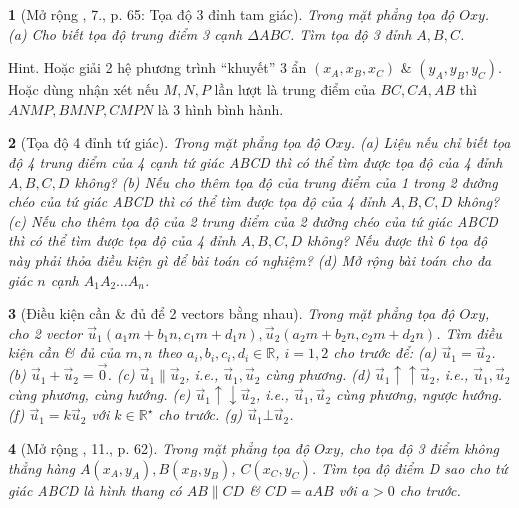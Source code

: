 \documentclass{article}
\newtheorem{baitoan}{}
\begin{document}
\begin{baitoan}[Mở rộng \cite{SGK_Toan_10_Canh_Dieu_tap_2}, 7., p. 65: Tọa độ 3 đỉnh tam giác]
	Trong mặt phẳng tọa độ $Oxy$. (a) Cho biết tọa độ trung điểm 3 cạnh $\Delta ABC$. Tìm tọa độ 3 đỉnh $A,B,C$.
\end{baitoan}
{\sf Hint.} Hoặc giải 2 hệ phương trình ``khuyết'' 3 ẩn $(x_A,x_B,x_C)$ \& $(y_A,y_B,y_C)$. Hoặc dùng nhận xét nếu $M,N,P$ lần lượt là trung điểm của $BC,CA,AB$ thì $ANMP,BMNP,CMPN$ là 3 hình bình hành.

\begin{baitoan}[Tọa độ 4 đỉnh tứ giác]
	Trong mặt phẳng tọa độ $Oxy$. (a) Liệu nếu chỉ biết tọa độ 4 trung điểm của 4 cạnh tứ giác ABCD thì có thể tìm được tọa độ của 4 đỉnh $A,B,C,D$ không? (b) Nếu cho thêm tọa độ của trung điểm của 1 trong 2 đường chéo của tứ giác ABCD thì có thể tìm được tọa độ của 4 đỉnh $A,B,C,D$ không? (c) Nếu cho thêm tọa độ của 2 trung điểm của 2 đường chéo của tứ giác ABCD thì có thể tìm được tọa độ của 4 đỉnh $A,B,C,D$ không? Nếu được thì 6 tọa độ này phải thỏa điều kiện gì để bài toán có nghiệm? (d) Mở rộng bài toán cho đa giác $n$ cạnh $A_1A_2\ldots A_n$.
\end{baitoan}

\begin{baitoan}[Điều kiện cần \& đủ để 2 vectors bằng nhau]
	Trong mặt phẳng tọa độ $Oxy$, cho 2 vector $\vec{u}_1(a_1m + b_1n,c_1m + d_1n),\vec{u}_2(a_2m + b_2n,c_2m + d_2n)$. Tìm điều kiện cần \& đủ của $m,n$ theo $a_i,b_i,c_i,d_i\in\mathbb{R}$, $i = 1,2$ cho trước để: (a) $\vec{u}_1 = \vec{u}_2$. (b) $\vec{u}_1 + \vec{u}_2 = \vec{0}$. (c) $\vec{u}_1\parallel\vec{u}_2$, i.e., $\vec{u}_1,\vec{u}_2$ cùng phương. (d) $\vec{u}_1\uparrow\uparrow\vec{u}_2$, i.e., $\vec{u}_1,\vec{u}_2$ cùng phương, cùng hướng. (e) $\vec{u}_1\uparrow\downarrow\vec{u}_2$, i.e., $\vec{u}_1,\vec{u}_2$ cùng phương, ngược hướng. (f) $\vec{u}_1 = k\vec{u}_2$ với $k\in\mathbb{R}^\star$ cho trước. (g) $\vec{u}_1\bot\vec{u}_2$.
\end{baitoan}

\begin{baitoan}[Mở rộng \cite{SBT_Toan_10_Canh_Dieu_tap_2}, 11., p. 62]
		Trong mặt phẳng tọa độ $Oxy$, cho tọa độ 3 điểm không thẳng hàng $A(x_A,y_A),B(x_B,y_B)$, $C(x_C,y_C)$. Tìm tọa độ điểm D sao cho tứ giác ABCD là hình thang có $AB\parallel CD$ \& $CD = aAB$ với $a > 0$ cho trước.
\end{baitoan}

\end{document}
